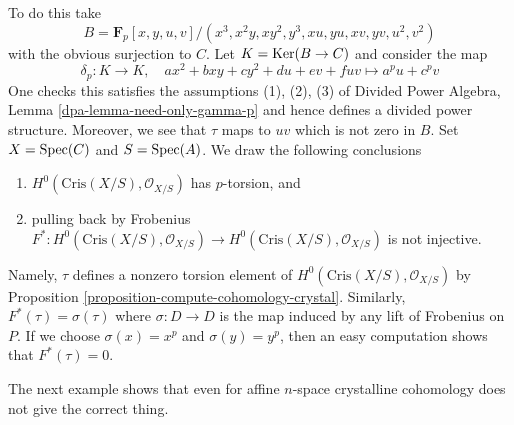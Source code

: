 \begin{example}
To do this take
$$
B = \mathbf{F}_p[x, y, u, v]/(x^3, x^2y, xy^2, y^3, xu, yu, xv, yv, u^2, v^2)
$$
with the obvious surjection to $C$. Let $K = \mathop{\mathrm{Ker}}(B \to C)$ and
consider the map
$$
\delta_p : K \longrightarrow K,\quad
ax^2 + bxy + cy^2 + du + ev + fuv \longmapsto a^pu + c^pv
$$
One checks this satisfies the assumptions (1), (2), (3) of
Divided Power Algebra, Lemma \ref{dpa-lemma-need-only-gamma-p}
and hence defines a divided power structure. Moreover,
we see that $\tau$ maps to $uv$ which is not zero in $B$.
Set $X = \mathop{\mathrm{Spec}}(C)$ and $S = \mathop{\mathrm{Spec}}(A)$.
We draw the following conclusions
\begin{enumerate}
\item $H^0(\text{Cris}(X/S), \mathcal{O}_{X/S})$ has $p$-torsion, and
\item pulling back by Frobenius $F^* : H^0(\text{Cris}(X/S), \mathcal{O}_{X/S})
\to H^0(\text{Cris}(X/S), \mathcal{O}_{X/S})$ is not injective.
\end{enumerate}
Namely, $\tau$ defines a nonzero torsion element of
$H^0(\text{Cris}(X/S), \mathcal{O}_{X/S})$ by
Proposition \ref{proposition-compute-cohomology-crystal}.
Similarly, $F^*(\tau) = \sigma(\tau)$ where $\sigma : D \to D$ is the
map induced by any lift of Frobenius on $P$. If we choose $\sigma(x) = x^p$
and $\sigma(y) = y^p$, then an easy computation shows that $F^*(\tau) = 0$.
\end{example}

\noindent
The next example shows that even for affine $n$-space crystalline
cohomology does not give the correct thing.


